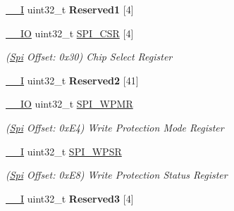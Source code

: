 \begin{DoxyCompactItemize}
\mbox{\label{structSpi_a860d681f1103018a8a78e2b37a679caa}} 
\mbox{\hyperlink{core__cm7_8h_af63697ed9952cc71e1225efe205f6cd3}{\+\_\+\+\_\+I}} uint32\+\_\+t {\bfseries Reserved1} \mbox{[}4\mbox{]}
\item 
\mbox{\label{structSpi_a1160632fa4e89a20292b8a8f51dcd3fc}} 
\mbox{\hyperlink{core__cm7_8h_aec43007d9998a0a0e01faede4133d6be}{\+\_\+\+\_\+\+IO}} uint32\+\_\+t \mbox{\hyperlink{structSpi_a1160632fa4e89a20292b8a8f51dcd3fc}{S\+P\+I\+\_\+\+C\+SR}} \mbox{[}4\mbox{]}
\begin{DoxyCompactList}\small\item\em (\mbox{\hyperlink{structSpi}{Spi}} Offset\+: 0x30) Chip Select Register \end{DoxyCompactList}\item 
\mbox{\label{structSpi_a376a1f6a7adea4d653d29ae054cb25b6}} 
\mbox{\hyperlink{core__cm7_8h_af63697ed9952cc71e1225efe205f6cd3}{\+\_\+\+\_\+I}} uint32\+\_\+t {\bfseries Reserved2} \mbox{[}41\mbox{]}
\item 
\mbox{\label{structSpi_aa50a6b8d402cbb0f75e48cdbfd3a077c}} 
\mbox{\hyperlink{core__cm7_8h_aec43007d9998a0a0e01faede4133d6be}{\+\_\+\+\_\+\+IO}} uint32\+\_\+t \mbox{\hyperlink{structSpi_aa50a6b8d402cbb0f75e48cdbfd3a077c}{S\+P\+I\+\_\+\+W\+P\+MR}}
\begin{DoxyCompactList}\small\item\em (\mbox{\hyperlink{structSpi}{Spi}} Offset\+: 0x\+E4) Write Protection Mode Register \end{DoxyCompactList}\item 
\mbox{\label{structSpi_adc4d26963ecf8db62fc9fea6e8841c33}} 
\mbox{\hyperlink{core__cm7_8h_af63697ed9952cc71e1225efe205f6cd3}{\+\_\+\+\_\+I}} uint32\+\_\+t \mbox{\hyperlink{structSpi_adc4d26963ecf8db62fc9fea6e8841c33}{S\+P\+I\+\_\+\+W\+P\+SR}}
\begin{DoxyCompactList}\small\item\em (\mbox{\hyperlink{structSpi}{Spi}} Offset\+: 0x\+E8) Write Protection Status Register \end{DoxyCompactList}\item 
\mbox{\label{structSpi_a44fcf12954aefb3b13862a10b1d3fd29}} 
\mbox{\hyperlink{core__cm7_8h_af63697ed9952cc71e1225efe205f6cd3}{\+\_\+\+\_\+I}} uint32\+\_\+t {\bfseries Reserved3} \mbox{[}4\mbox{]}

\end{DoxyCompactItemize}
